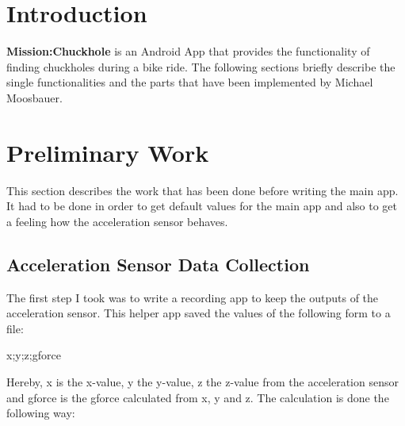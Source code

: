 \documentclass[10pt,a4paper]{article} %
\begin{document}
    \pagestyle{plain}
    \title{\rmfamily\normalfont{}}
    \author{}
    \date{} %
    
    \maketitle
    
       
    \tableofcontents


	

    
    \section{Introduction}
	\textbf{Mission:Chuckhole} is an Android App that provides the functionality of finding chuckholes during a bike ride. 
	The following sections briefly describe the single functionalities and the parts that have been implemented by Michael Moosbauer.


    \section{Preliminary Work}

	This section describes the work that has been done before writing the main app.
	It had to be done in order to get default values for the main app and also to get a feeling how the acceleration sensor behaves.
	
	\subsection{Acceleration Sensor Data Collection}\label{subsec:data_collection}
		
		The first step I took was to write a recording app to keep the outputs of the acceleration sensor.
		This helper app saved the values of the following form to a file:

		\begin{center}
			x;y;z;gforce
		\end{center}

		Hereby, x is the x-value, y the y-value, z the z-value from the acceleration sensor and gforce is the gforce calculated from x, y and z.
		The calculation is done the following way:
\end{document}

